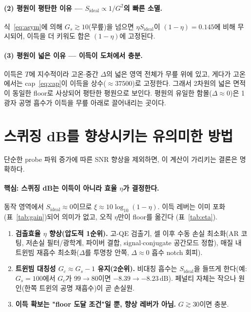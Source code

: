 \documentclass[11pt,a4paper]{article}
\newcommand{\dB}{\,\mathrm{dB}}
\begin{document}
\paragraph{(2) 평원이 평탄한 이유 --- $S_{\mathrm{ideal}}\propto 1/G^2$의 빠른 소멸.}
식~\eqref{eq:asym}에 의해 $G_s\gtrsim 10$(무릎)을 넘으면 $\eta S_{\mathrm{ideal}}$이
$(1-\eta)=0.145$에 비해 무시되어, 이득을 더 키워도 합은 $(1-\eta)$에 고정된다.

\paragraph{(3) 평원이 넓은 이유 --- 이득이 도처에서 충분.}
이득은 $T$에 지수적이라 고온$\cdot$중간 $\Delta$의 넓은 영역 전체가 무릎 위에 있고, 게다가
고온에서는 cap~\eqref{eq:cap}이 이득을 상수($\approx 37500$)로 고정한다. 그래서 2차원의
넓은 면적이 동일한 floor로 사상되어 평탄한 평원으로 보인다. 평원의 유일한 함몰($\Delta\approx
0$)은 1광자 공명 흡수가 이득을 무릎 아래로 끌어내리는 곳이다.

\section{스퀴징 dB를 향상시키는 유의미한 방법}
단순한 probe 파워 증가에 따른 SNR 향상을 제외하면, 이 계산이 가리키는 결론은 명확하다.

\paragraph{핵심: 스퀴징 dB는 이득이 아니라 효율 $\eta$가 결정한다.}
동작 영역에서 $S_{\mathrm{ideal}}\approx 0$이므로 $\xi\approx 10\log_{10}(1-\eta)$. 이득
레버는 이미 포화(표~\ref{tab:gain})되어 의미가 없고, 오직 $\eta$만이 floor를 옮긴다
(표~\ref{tab:eta}).

\begin{enumerate}[nosep]
\item \textbf{검출효율 $\eta$ 향상(압도적 1순위).} 고-QE 검출기, 셀 이후 수동 손실
      최소화(AR 코팅, 저손실 필터/광학계, 파이버 결합, signal$\cdot$conjugate 공간모드 정합),
      매질 내 트윈빔 재흡수 최소화($\Delta$를 투명창 안쪽, $\Delta\approx 0$ 흡수 notch 회피).
\item \textbf{트윈빔 대칭성 $G_c\approx G_s-1$ 유지(2순위).} 비대칭 흡수는
      $S_{\mathrm{ideal}}$을 들뜨게 한다(예: $G_s=100$에서 $G_c$가 $99\to 80$이면
      $-8.39\to -8.23\dB$). 페널티 자체는 작으나 원인(한쪽 트윈의 공명 재흡수)이 곧 손실원.
\item \textbf{이득 확보는 "floor 도달 조건"일 뿐, 향상 레버가 아님.} $G\gtrsim 30$이면 충분.
\end{enumerate}
\end{document}

